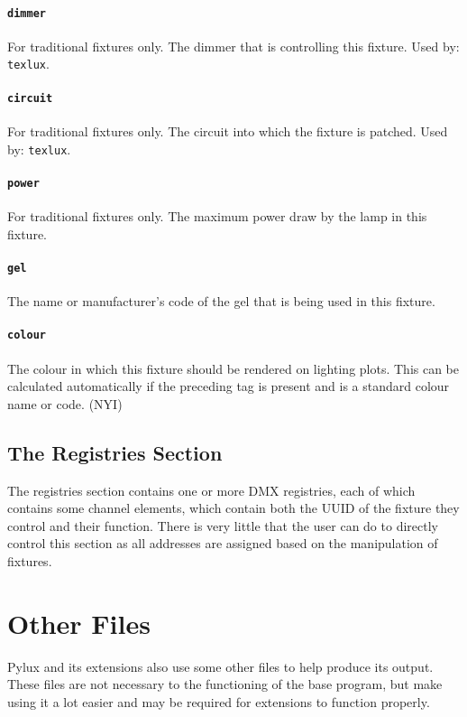 \documentclass[a4paper]{article}
\begin{document}
\paragraph{\texttt{dimmer}}
For traditional fixtures only. The dimmer that is controlling this fixture. 
Used by: \texttt{texlux}.

\paragraph{\texttt{circuit}}
For traditional fixtures only. The circuit into which the fixture is patched. 
Used by: \texttt{texlux}.

\paragraph{\texttt{power}}
For traditional fixtures only. The maximum power draw by the lamp in this 
fixture.

\paragraph{\texttt{gel}}
The name or manufacturer's code of the gel that is being used in this 
fixture.

\paragraph{\texttt{colour}}
The colour in which this fixture should be rendered on lighting plots. This 
can be calculated automatically if the preceding tag is present and is a 
standard colour name or code. (NYI)

\subsection{The Registries Section}
The registries section contains one or more DMX registries, each of which 
contains some channel elements, which contain both the UUID of the fixture 
they control and their function. There is very little that the user can do 
to directly control this section as all addresses are assigned based on 
the manipulation of fixtures.

\section{Other Files}
Pylux and its extensions also use some other files to help produce its output. 
These files are not necessary to the functioning of the base program, but 
make using it a lot easier and may be required for extensions to function 
properly.
\end{document}
